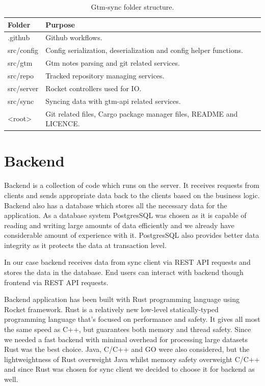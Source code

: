 \begin{table}[h]
    \centering
    \begin{tabular}{ | p{3cm} | p{10cm} |}
        \hline
        Folder & Purpose\\
        \hline
        .github & Github workflows.\\
        \hline
        src/config & Config serialization, deserialization and config helper functions.\\
        \hline
        src/gtm & Gtm notes parsing and git related services.\\
        \hline
        src/repo & Tracked repository managing services.\\
        \hline
        src/server & Rocket controllers used for IO.\\
        \hline
        src/sync & Syncing data with gtm-api related services.\\
        \hline
        <root> & Git related files, Cargo package manager files, README and LICENCE.\\
        \hline
    \end{tabular}
    \caption{Gtm-sync folder structure.}
    \label{tab:gtm-sync-folder-structure}
\end{table}

\section{Backend}\label{sec:backend}
Backend is a collection of code which runs on the server.
It receives requests from clients and sends appropriate data back to the clients based on the business logic.
Backend also has a database which stores all the necessary data for the application.
As a database system PostgresSQL was chosen as it is capable of reading and writing large amounts of data efficiently and we already have considerable amount of experience with it.
PostgresSQL also provides better data integrity as it protects the data at transaction level. %

In our case backend receives data from sync client via REST API requests and stores the data in the database.
End users can interact with backend though frontend via REST API requests.

Backend application has been built with Rust programming language using Rocket framework.
Rust is a relatively new low-level statically-typed programming language that's focused on performance and safety.
It gives all most the same speed as C++, but guarantees both memory and thread safety.
Since we needed a fast backend with minimal overhead for processing large datasets Rust was the best choice.
Java, C/C++ and GO were also considered, but the lightweightness of Rust overweight Java whilst memory safety overweight C/C++
and since Rust was chosen for sync client we decided to choose it for backend as well.

